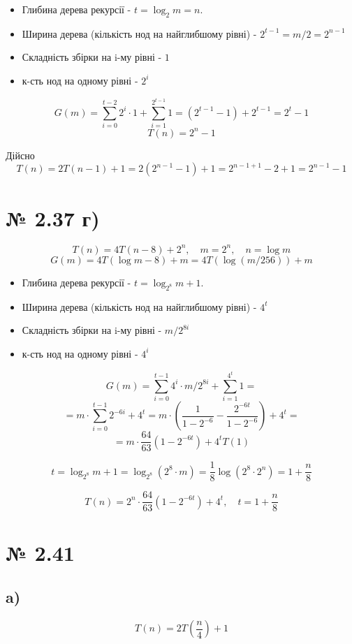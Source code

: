 \documentclass[11pt, a4paper]{article} %
\begin{document}
\begin{itemize}
    \item Глибина дерева рекурсії - $t = \log_2 m  = n$.
    \item Ширина дерева (кількість нод на найглибшому рівні) - $2^{t-1} = m/2 = 2^{n-1}$
    \item Складність збірки на i-му рівні - $1$
    \item к-сть нод на одному рівні - $2^i$
\end{itemize}

$$G(m) = \sum_{i=0}^{t-2} 2^i\cdot 1 + \sum_{i=1}^{2^{t-1}} 1 = (2^{t-1}-1) + 2^{t-1} = 2^t - 1$$
$$T(n) = 2^n - 1$$

Дійсно
$$T(n) = 2T(n-1) + 1 = 2(2^{n-1} - 1) + 1 = 2^{n-1+1} -2 + 1 = 2^{n-1} - 1$$

\section*{№ 2.37 г)}
$$T(n) = 4T(n-8) +2^n, \quad m=2^n, \quad n = \log m$$
$$G(m) = 4T(\log m - 8) + m = 4T(\log (m/256)) + m $$

\begin{itemize}
    \item Глибина дерева рекурсії - $t = \log_{2^8} m + 1$.
    \item Ширина дерева (кількість нод на найглибшому рівні) - $4^{t}$
    \item Складність збірки на i-му рівні - $m/2^{8i}$
    \item к-сть нод на одному рівні - $4^i$
\end{itemize}

$$G(m) = \sum_{i=0}^{t-1} 4^i\cdot m/2^{8i} + \sum_{i=1}^{4^t} 1 = $$
$$= m \cdot \sum_{i=0}^{t-1} 2^{-6i} + 4^t = m \cdot (\frac{1}{1-2^{-6}} - \frac{2^{-6t}}{1-2^{-6}})  + 4^t = $$
$$= m \cdot \frac{64}{63} ( 1 - 2^{-6t} ) + 4^t T(1) $$

$$t = \log_{2^8} m + 1 = \log_{2^8} (2^8 \cdot m) = \frac{1}{8} \log (2^8 \cdot 2^n) = 1 + \frac{n}{8}$$

$$T(n) = 2^n \cdot \frac{64}{63} ( 1 - 2^{-6t} ) + 4^t, \quad t = 1 + \frac{n}{8} $$


\section*{№ 2.41}
\subsection*{a)}
\begin{mdframed}
    $$T(n) = 2T(\frac{n}{4}) + 1$$
\end{mdframed}
\end{document}
